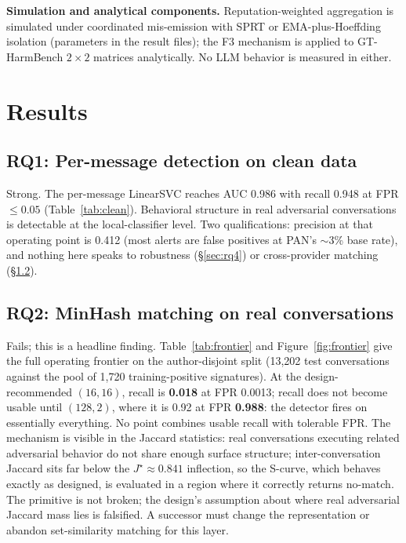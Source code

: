 \documentclass[letterpaper,twocolumn,10pt]{article}
\begin{document}
\textbf{Simulation and analytical components.} Reputation-weighted
aggregation is simulated under coordinated mis-emission with SPRT or
EMA-plus-Hoeffding isolation (parameters in the result files); the F3
mechanism is applied to GT-HarmBench $2\times2$ matrices analytically. No
LLM behavior is measured in either.

\section{Results}
\label{sec:results}

\subsection{RQ1: Per-message detection on clean data}
\label{sec:rq1}
Strong. The per-message LinearSVC reaches AUC 0.986 with recall 0.948 at
FPR $\leq 0.05$ (Table~\ref{tab:clean}). Behavioral structure in real
adversarial conversations is detectable at the local-classifier level. Two
qualifications: precision at that operating point is 0.412 (most alerts
are false positives at PAN's $\sim$3\% base rate), and nothing here speaks
to robustness (\S\ref{sec:rq4}) or cross-provider matching
(\S\ref{sec:rq2}).

\begin{table}[!t]
\centering
\footnotesize
\resizebox{\columnwidth}{!}{%
}
\caption{Clean-data detection (conversation-level split; operating points at
FPR $\leq 0.05$). Source: \texttt{trajectory\_lift.json}.}
\label{tab:clean}
\end{table}

\subsection{RQ2: MinHash matching on real conversations}
\label{sec:rq2}
Fails; this is a headline finding. Table~\ref{tab:frontier} and
Figure~\ref{fig:frontier} give the full operating frontier on the
author-disjoint split (13{,}202 test conversations against the pool of
1{,}720 training-positive signatures). At the design-recommended $(16,16)$,
recall is \textbf{0.018} at FPR 0.0013; recall does not become usable until
$(128,2)$, where it is 0.92 at FPR \textbf{0.988}: the detector fires on
essentially everything. No point combines usable recall with tolerable FPR.
The mechanism is visible in the Jaccard statistics: real conversations
executing related adversarial behavior do not share enough surface
structure; inter-conversation Jaccard sits far below the $J^\star \approx
0.841$ inflection, so the S-curve, which behaves exactly as designed,
is evaluated in a region where it correctly returns no-match. The primitive
is not broken; the design's assumption about where real adversarial Jaccard
mass lies is falsified. A successor must change the representation or
abandon set-similarity matching for this layer.
\end{document}
